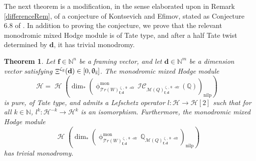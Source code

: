 \documentclass[a4paper,10pt]{amsart}
\newtheorem{theorem}{Theorem}[section]
\newcommand{\dd}{\mathbf{d}}
\newcommand{\ff}{\mathbf{f}}
\newcommand{\QQ}{\mathbb{Q}}
\DeclareMathOperator{\sfr}{-sfr}
\newcommand{\WW}{\mathcal{T}r(W)}
\newcommand{\Msp}{\mathcal{M}}
\newcommand{\ICS}{\mathcal{IC}}
\newcommand{\phim}[1]{\phi^{\mon}_{#1}}
\renewcommand{\theta}{\uptheta}
\renewcommand{\zeta}{\upzeta}
\renewcommand{\phi}{\upphi}
\DeclareMathOperator{\nilp}{nilp}
\DeclareMathOperator{\mon}{mon}
\DeclareMathOperator{\Mu}{\Upxi}
\DeclareMathOperator{\Ss}{\overline{s}}
\DeclareMathOperator{\Ho}{\mathcal{H}}
\begin{document}
The next theorem is a modification, in the sense elaborated upon in Remark \ref{differenceRem}, of a conjecture of Kontsevich and Efimov, stated as Conjecture 6.8 of \cite{Efi11}.  In addition to proving the conjecture, we prove that the relevant monodromic mixed Hodge module is of Tate type, and after a half Tate twist determined by $\dd$, it has trivial monodromy.
\begin{theorem}
\label{KConj}
Let $\ff\in\mathbb{N}^n$ be a framing vector, and let $\dd\in \mathbb{N}^m$ be a dimension vector satisfying $\Mu^{\zeta_{\Ss}}(\dd)\in[0,\theta_{\Ss}]$.  The monodromic mixed Hodge module 
\[
\mathcal{H}=\Ho\left(\dim_*\left(\phim{\WW^{\zeta_{\Ss},\theta_{\Ss}\sfr}_{\ff,\dd}}\ICS_{\Msp(Q)^{\zeta_{\Ss},\theta_{\Ss}\sfr}_{\ff,\dd}}(\mathbb{Q})\right)_{\nilp}\right)\
\]
is pure, of Tate type, and admits a Lefschetz operator $l\colon\mathcal{H}\rightarrow\mathcal{H}[2]$ such that for all $k\in\mathbb{N}$, $l^k\colon\mathcal{H}^{-k}\rightarrow\mathcal{H}^k$ is an isomorphism.  Furthermore, the monodromic mixed Hodge module
\[
\Ho\left(\dim_*\left(\phim{\WW^{\zeta_{\Ss},\theta_{\Ss}\sfr}_{\ff,\dd}}\QQ_{\Msp(Q)^{\zeta_{\Ss},\theta_{\Ss}\sfr}_{\ff,\dd}}\right)_{\nilp}\right)
\]
has trivial monodromy.
\end{theorem}
\end{document}

